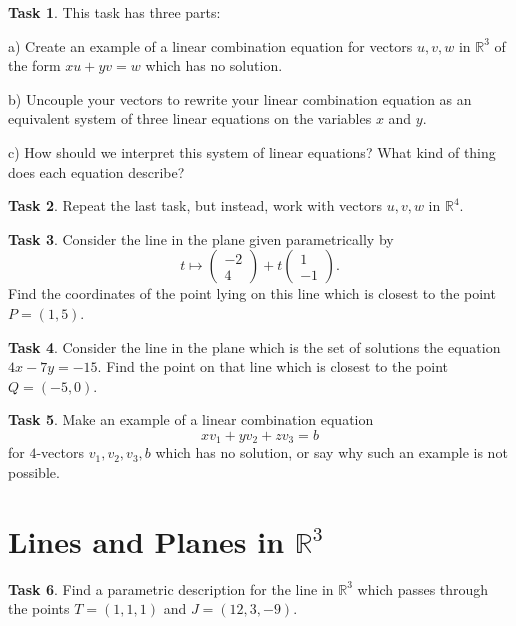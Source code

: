\documentclass{tufte-book}
\theoremstyle{definition}
\newtheorem{task}{Task}
\begin{document}
\begin{task} This task has three parts:
\begin{compactitem}
\item[a)] Create an example of a linear combination equation for vectors $u, v, w$ in $\mathbb{R}^3$ of the form $x u + y v = w$ which has no solution.
\item[b)] Uncouple your vectors to rewrite your linear combination equation as an equivalent system of three linear equations on the variables $x$ and $y$.
\item[c)] How should we interpret this system of linear equations? What kind of thing does each equation describe?
\end{compactitem}
\end{task}


\begin{task}
Repeat the last task, but instead, work with vectors $u, v, w$ in $\mathbb{R}^4$.
\end{task}


\begin{task}
Consider the line in the plane given parametrically by 
\[
t \mapsto \begin{pmatrix} -2 \\ 4 \end{pmatrix} + t \begin{pmatrix} 1 \\ -1\end{pmatrix}.
\]
Find the coordinates of the point lying on this line which is closest to the point $P = (1,5)$.
\end{task}


\begin{task}
Consider the line in the plane which is the set of solutions the equation $4x-7y=-15$. Find the point on that line which is closest to the point $Q=(-5,0)$.
\end{task}

\begin{task}
Make an example of a linear combination equation 
\[
xv_1 + y v_2 + z v_3 = b
\]
for $4$-vectors $v_1, v_2, v_3, b$ which has no solution, or say why such an example is not possible.
\end{task}

\section*{Lines and Planes in $\mathbb{R}^3$}


\begin{task}
Find a parametric description for the line in $\mathbb{R}^3$ which passes through the points $T = (1,1,1)$ and $J=(12,3,-9)$.
\end{task}
\end{document}
